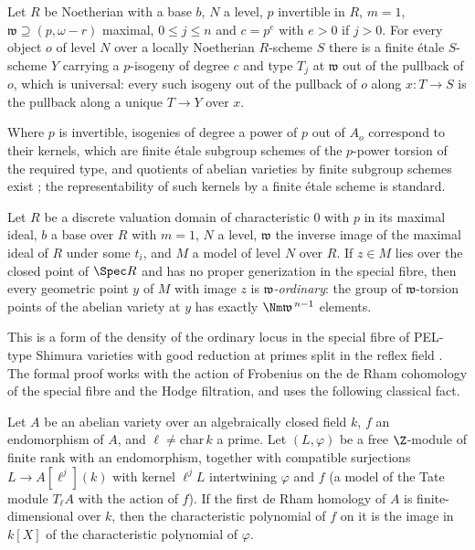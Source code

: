 \begin{littheorem}\label{pf:ks2:classical:tj}
Let $R$ be Noetherian with a base $b$, $N$ a level, $p$ invertible in $R$, $m=1$, $\mathfrak w\supseteq
(p,\omega-r)$ maximal, $0\le j\le n$ and $c=p^e$ with $e>0$ if $j>0$. For every object $o$ of level
$N$ over a locally Noetherian $R$-scheme $S$ there is a finite \'etale $S$-scheme $Y$ carrying a
$p$-isogeny of degree $c$ and type $T_j$ at $\mathfrak w$ out of the pullback of $o$, which is
universal: every such isogeny out of the pullback of $o$ along $x\colon T\to S$ is the pullback
along a unique $T\to Y$ over $x$.
\end{littheorem}

Where $p$ is invertible, isogenies of degree a power of $p$ out of $A_o$ correspond to their kernels,
which are finite \'etale subgroup schemes of the $p$-power torsion of the required type, and
quotients of abelian varieties by finite subgroup schemes exist \cite{Mumford1970}; the
representability of such kernels by a finite \'etale scheme is standard.

\begin{littheorem}\label{pf:ks2:classical:ord}
Let $R$ be a discrete valuation domain of characteristic $0$ with $p$ in its maximal ideal, $b$ a
base over $R$ with $m=1$, $N$ a level, $\mathfrak w$ the inverse image of the maximal ideal of $R$
under some $t_i$, and $M$ a model of level $N$ over $R$. If $z\in M$ lies over the closed point of
$\Spec R$ and has no proper generization in the special fibre, then every geometric point $y$ of $M$
with image $z$ is \emph{$\mathfrak w$-ordinary}: the group of $\mathfrak w$-torsion points of the abelian
variety at $y$ has exactly $\Nm\mathfrak w^{\,n-1}$ elements.
\end{littheorem}

This is a form of the density of the ordinary locus in the special fibre of PEL-type Shimura
varieties with good reduction at primes split in the reflex field \cite{Wedhorn1999}. The formal
proof works with the action of Frobenius on the de Rham cohomology of the special fibre and the
Hodge filtration, and uses the following classical fact.

\begin{littheorem}\label{pf:ks2:classical:charpoly}
Let $A$ be an abelian variety over an algebraically closed field $k$, $f$ an endomorphism of $A$, and
$\ell\ne\mathrm{char}\,k$ a prime. Let $(L,\varphi)$ be a free $\Z$-module of finite rank with an
endomorphism, together with compatible surjections $L\to A[\ell^j](k)$ with kernel $\ell^jL$
intertwining $\varphi$ and $f$ (a model of the Tate module $T_\ell A$ with the action of $f$). If the
first de Rham homology of $A$ is finite-dimensional over $k$, then the characteristic polynomial of
$f$ on it is the image in $k[X]$ of the characteristic polynomial of $\varphi$.
\end{littheorem}


